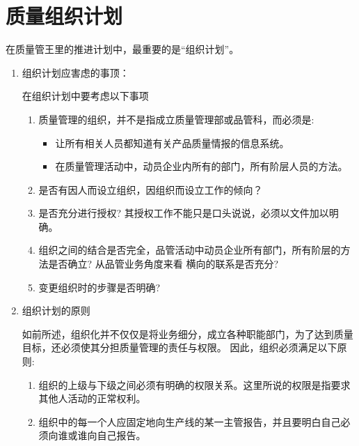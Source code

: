 \section {质量组织计划}

    在质量管王里的推进计划中，最重要的是“组织计划”。

    \begin{enumerate}
        \item 组织计划应害虑的事顶：

            在组织计划中要考虑以下事项

            \begin{enumerate}
                \item 质量管理的组织，并不是指成立质量管理部或品管科，而必须是:
                    \begin{itemize}
                        \item 让所有相关人员都知道有关产品质量情报的信息系统。

                        \item 在质量管理活动中，动员企业内所有的部门，所有阶层人员的方法。
                    \end{itemize}

                \item 是否有因人而设立组织，因组织而设立工作的倾向？

                \item 是否充分进行授权? 其授权工作不能只是口头说说，必须以文件加以明确。

                \item 组织之间的结合是否完全，品管活动中动员企业所有部门，所有阶层的方法是否确立? 从品管业务角度来看 横向的联系是否充分?

                \item 变更组织时的步骤是否明确?

             \end{enumerate}
        \item 组织计划的原则

        如前所述，组织化并不仅仅是将业务细分，成立各种职能部门，为了达到质量目标，还必须使其分担质量管理的责任与权限。 因此，组织必须满足以下原则:

            \begin{enumerate}
                \item 组织的上级与下级之间必须有明确的权限关系。这里所说的权限是指要求其他人活动的正常权利。

                \item 组织中的每一个人应固定地向生产线的某一主管报告，并且要明白自己必须向谁或谁向自己报告。


\end{enumerate}
\end{enumerate}
